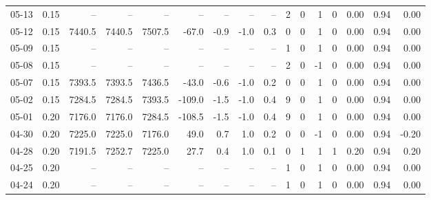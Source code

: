 \begin{threeparttable}
{\begin{tabular}{lrrrrrrrrrrrrrrr}
  05-13 &     0.15 &     -- &     -- &     -- &         -- &             -- &                       -- &                  -- &              2 &         0 &     1 &         0 &       0.00 &      0.94 &           0.00 \\
  05-12 &     0.15 & 7440.5 & 7440.5 & 7507.5 &      -67.0 &           -0.9 &                     -1.0 &                 0.3 &              0 &         0 &     1 &         0 &       0.00 &      0.94 &           0.00 \\
  05-09 &     0.15 &     -- &     -- &     -- &         -- &             -- &                       -- &                  -- &              1 &         0 &     1 &         0 &       0.00 &      0.94 &           0.00 \\
  05-08 &     0.15 &     -- &     -- &     -- &         -- &             -- &                       -- &                  -- &              2 &         0 &    -1 &         0 &       0.00 &      0.94 &           0.00 \\
  05-07 &     0.15 & 7393.5 & 7393.5 & 7436.5 &      -43.0 &           -0.6 &                     -1.0 &                 0.2 &              0 &         0 &     1 &         0 &       0.00 &      0.94 &           0.00 \\
  05-02 &     0.15 & 7284.5 & 7284.5 & 7393.5 &     -109.0 &           -1.5 &                     -1.0 &                 0.4 &              9 &         0 &     1 &         0 &       0.00 &      0.94 &           0.00 \\
  05-01 &     0.20 & 7176.0 & 7176.0 & 7284.5 &     -108.5 &           -1.5 &                     -1.0 &                 0.4 &              9 &         0 &     1 &         0 &       0.00 &      0.94 &           0.00 \\
  04-30 &     0.20 & 7225.0 & 7225.0 & 7176.0 &       49.0 &            0.7 &                      1.0 &                 0.2 &              0 &         0 &    -1 &         0 &       0.00 &      0.94 &          -0.20 \\
  04-28 &     0.20 & 7191.5 & 7252.7 & 7225.0 &       27.7 &            0.4 &                      1.0 &                 0.1 &              0 &         1 &     1 &         1 &       0.20 &      0.94 &           0.20 \\
  04-25 &     0.20 &     -- &     -- &     -- &         -- &             -- &                       -- &                  -- &              1 &         0 &     1 &         0 &       0.00 &      0.94 &           0.00 \\
  04-24 &     0.20 &     -- &     -- &     -- &         -- &             -- &                       -- &                  -- &              1 &         0 &     1 &         0 &       0.00 &      0.94 &           0.00 \\

\end{tabular}}
\end{threeparttable}
